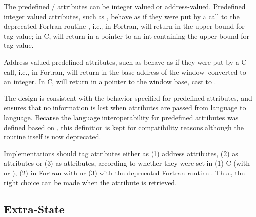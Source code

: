 The predefined \MPI/ attributes can be integer valued or address-valued.
Predefined integer valued attributes, such as ,
behave as if they
were put by a call to the
  deprecated Fortran routine ,
i.e.,
in Fortran,
will return in 
the upper bound for tag value; in C,
%
will return in 
a pointer to an int containing the upper bound for tag value.

Address-valued predefined attributes, such as 
behave as if
they were put by a C call,
i.e.,
in  Fortran,
will return in  the base address of the window,
converted to an integer.  In C,
%
will return in 
a pointer to the window base, cast to .

\begin{rationale}
The design is consistent with the behavior
specified
for predefined
attributes, and ensures that no information is lost when attributes are
passed from language to language.
Because the language interoperability for
  predefined attributes was defined based on ,
  this definition is kept for compatibility reasons although the
  routine itself is now deprecated.
\end{rationale}

\begin{implementors}
  Implementations should tag attributes either as
  (1)
    address attributes, (2) as
     attributes or (3) as
     attributes, according to whether they were set in
    (1) C (with  or
%
    ), (2) in Fortran with
     or (3) with the deprecated Fortran
    routine .
    Thus, the right choice can be made when the attribute is retrieved.
\end{implementors}

\subsection{Extra-State}

